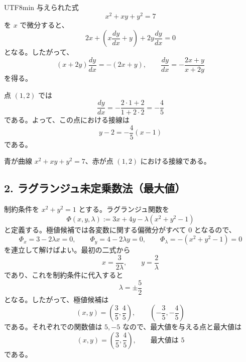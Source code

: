 \documentclass[a4paper,12pt]{article}
\begin{document}
\begin{CJK}{UTF8}{min}
与えられた式
\[
x^2+xy+y^2=7
\]
を $x$ で微分すると、
\[
2x+\left(x\frac{dy}{dx}+y\right)+2y\frac{dy}{dx}=0
\]
となる。したがって、
\[
\left(x+2y\right)\frac{dy}{dx}=-(2x+y),
\qquad
\frac{dy}{dx}=-\frac{2x+y}{x+2y}
\]
を得る。

点 $(1,2)$ では
\[
\frac{dy}{dx}=-\frac{2\cdot1+2}{1+2\cdot2}=-\frac45
\]
である。よって、この点における接線は
\[
y-2=-\frac45(x-1)
\]
である。

\begin{center}
\end{center}

青が曲線 $x^2+xy+y^2=7$、赤が点 $(1,2)$ における接線である。

\subsection*{2. ラグランジュ未定乗数法（最大値）}

制約条件を $x^2+y^2=1$ とする。ラグランジュ関数を
\[
\Phi(x,y,\lambda):=3x+4y-\lambda(x^2+y^2-1)
\]
と定義する。極値候補では各変数に関する偏微分がすべて $0$ となるので、
\[
\Phi_x=3-2\lambda x=0,\qquad
\Phi_y=4-2\lambda y=0,\qquad
\Phi_\lambda=-(x^2+y^2-1)=0
\]
を連立して解けばよい。最初の二式から
\[
x=\frac{3}{2\lambda},\qquad y=\frac{2}{\lambda}
\]
であり、これを制約条件に代入すると
\[
\lambda=\pm\frac52
\]
となる。したがって、極値候補は
\[
(x,y)=\left(\frac35,\frac45\right),\qquad
\left(-\frac35,-\frac45\right)
\]
である。それぞれでの関数値は $5,-5$ なので、最大値を与える点と最大値は
\[
{(x,y)=\left(\frac35,\frac45\right)},
\qquad
{\text{最大値は }5}
\]
である。

\ifPDFTeX
\end{CJK}
\fi
\end{document}
